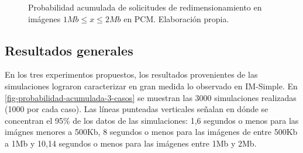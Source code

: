 %
\begin{figure}
\hspace{-2cm}
\caption[\hspace{0.2cm} Probabilidad acumulada de solicitudes de redimensionamiento en imágenes $1Mb \leq x \leq 2Mb$ en PCM]{Probabilidad acumulada de solicitudes de redimensionamiento en imágenes $1Mb \leq x \leq 2Mb$ en PCM. Elaboración propia.}
\label{fig:funcion-acumulada-palladio-2mb}
\end{figure}

\subsection{Resultados generales}
En los tres experimentos propuestos, los resultados provenientes de las simulaciones lograron caracterizar en gran medida lo observado en IM-Simple. En \ref{fig-probabilidad-acumulada-3-casos} se muestran las 3000 simulaciones realizadas (1000 por cada caso). Las líneas punteadas verticales señalan en dónde se concentran el 95\% de los datos de las simulaciones: 1,6 segundos o menos para las imágnes menores a 500Kb, 8 segundos o menos para las imágenes de entre 500Kb a 1Mb y 10,14 segundos o menos para las imágenes entre 1Mb y 2Mb. 

